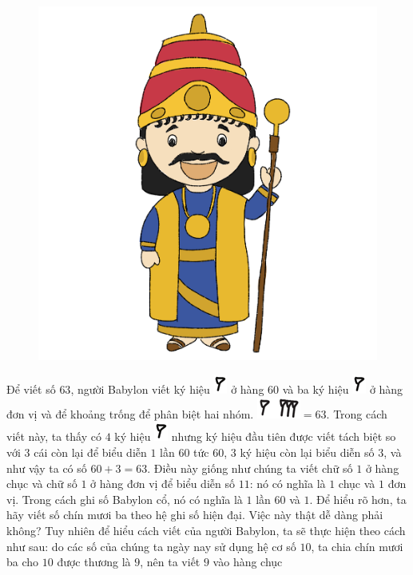 \begin{multicols}{2}
\begin{figure}[H]
		\includegraphics[width=0.85\linewidth]{20.12-pi.2}
		\vspace*{-15pt}
	\end{figure}
	Để viết số $63$, người Babylon viết ký hiệu  \includegraphics[scale=0.7]{15}  ở hàng $60$ và ba ký hiệu \includegraphics[scale=0.7]{15}  ở hàng đơn vị và để khoảng trống để phân biệt hai nhóm.
	\vskip 0.1cm
	\includegraphics[scale=0.7]{16.1}$=63$. Trong cách viết này, ta thấy có $4$ ký hiệu \includegraphics[scale=0.7]{15}   nhưng ký hiệu đầu tiên được viết tách biệt so với $3$ cái còn lại để biểu diễn $1$ lần $60$ tức $60$, $3$ ký hiệu còn lại biểu diễn số $3$, và như vậy ta có số $60+3 =63$.
	\vskip 0.1cm
	Điều này giống như chúng ta viết chữ số $1$ ở hàng chục và chữ số $1$ ở hàng đơn vị để biểu diễn số $11$: nó có nghĩa là $1$ chục và $1$ đơn vị. Trong  cách ghi số  Babylon cổ, nó có nghĩa là $1$ lần $60$  và $1$.
	\vskip 0.1cm
	Để hiểu rõ hơn, ta hãy viết số chín mươi ba theo hệ ghi số hiện đại. Việc này thật dễ dàng phải không? Tuy nhiên để hiểu cách viết của người Babylon, ta sẽ thực hiện theo cách như sau: do các số của chúng ta ngày nay sử dụng hệ cơ số $10$, ta chia chín mươi ba cho $10$ được thương là $9$, nên ta viết $9$ vào hàng chục

\end{multicols}
